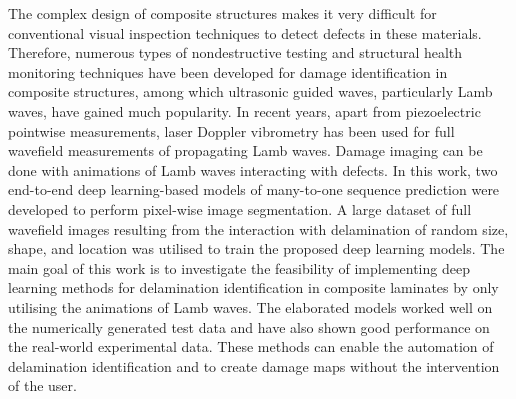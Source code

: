 The complex design of composite structures makes it very difficult for conventional visual inspection techniques to detect defects in these materials. 
Therefore, numerous types of nondestructive testing and structural health monitoring techniques have been developed for damage identification in composite structures, among which ultrasonic guided waves, particularly Lamb waves, have gained much popularity.
In recent years, apart from piezoelectric pointwise measurements, laser Doppler vibrometry has been used for full wavefield measurements of propagating Lamb waves. 
Damage imaging can be done with animations of Lamb waves interacting with defects.
In this work, two end-to-end deep learning-based models of many-to-one sequence prediction were developed to perform pixel-wise image segmentation.
A large dataset of full wavefield images resulting from the interaction with delamination of random size, shape, and location was utilised to train the proposed deep learning models.
The main goal of this work is to investigate the feasibility of implementing deep learning methods for delamination identification in composite laminates by only utilising the animations of Lamb waves.
The elaborated models worked well on the numerically generated test data and have also shown good performance on the real-world experimental data.
These methods can enable the automation of delamination identification and to create damage maps without the intervention of the user.